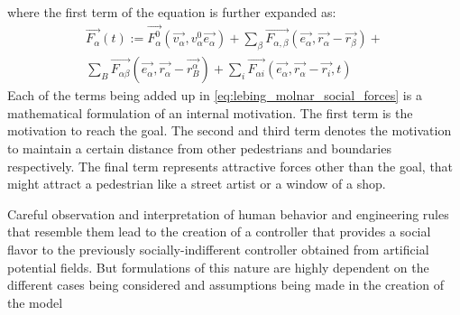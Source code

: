 where the first term of the equation is further expanded as:\\
\begin{multline}
\label{eq:lebing_molnar_social_forces}
\vec{F_{\alpha}}(t):=
\vec{F_{\alpha}^{0}}(\vec{v_{\alpha}}, v_{\alpha}^{0}\vec{e_{\alpha}})+\sum_{\beta}\vec{F_{\alpha, \beta}}(\vec{e_{\alpha}}, \vec{r_{\alpha}} - \vec{r_{\beta}})
+\\\sum_{B}\vec{F_{\alpha\beta}}(\vec{e_{\alpha}}, \vec{r_{\alpha}} - \vec{r_{B}^{\alpha}}) + \sum_{i}\vec{F_{\alpha i}}(\vec{e_{\alpha}}, \vec{r_{\alpha}}-\vec{r_i},t)
\end{multline}
Each of the terms being added up in \autoref{eq:lebing_molnar_social_forces} is a mathematical formulation of an internal motivation.
The first term is the motivation to reach the goal.
The second and third term denotes the motivation to maintain a certain distance from other pedestrians and boundaries respectively.
The final term represents attractive forces other than the goal, that might attract a pedestrian like a street artist or a window of a shop.
\par
Careful observation and interpretation of human behavior and engineering rules that resemble them lead to the creation of a controller that provides a social flavor to the previously socially-indifferent controller obtained from artificial potential fields. But formulations of this nature are highly dependent on the different cases being considered and assumptions being made in the creation of the model


